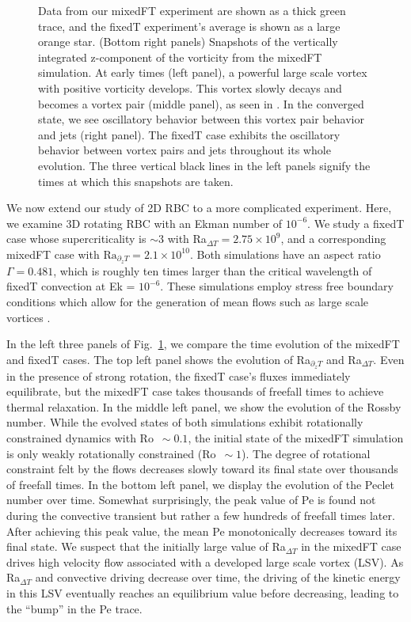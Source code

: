 \documentclass[aps, pre, onecolumn, nofootinbib, notitlepage, groupedaddress, amsfonts, amssymb, amsmath, longbibliography, superscriptaddress]{revtex4-1}
\begin{document}
\begin{figure}
{	Data from our mixedFT experiment are shown as a thick green trace, and the fixedT experiment's average is shown as a large orange star.
	(Bottom right panels) Snapshots of the vertically integrated z-component of the vorticity from the mixedFT simulation.
	At early times (left panel), a powerful large scale vortex with positive vorticity develops.
	This vortex slowly decays and becomes a vortex pair (middle panel), as seen in \cite{stellmach&all2014}.
	In the converged state, we see oscillatory behavior between this vortex pair behavior and jets (right panel).
	The fixedT case exhibits the oscillatory behavior between vortex pairs and jets throughout its whole evolution.
	The three vertical black lines in the left panels signify the times at which this snapshots are taken.
\label{fig:rotating_panels} }
\end{figure}



We now extend our study of 2D RBC to a more complicated experiment.
Here, we examine 3D rotating RBC with an Ekman number of $10^{-6}$.
We study a fixedT case whose supercriticality is $\sim 3$ with Ra$_{\Delta T} = 2.75\times 10^9$, and a corresponding mixedFT case with $\text{Ra}_{\partial_z T} = 2.1 \times 10^{10}$.
Both simulations have an aspect ratio $\Gamma = 0.481$, which is roughly ten times larger than the critical wavelength of fixedT convection at Ek = $10^{-6}$.
These simulations employ stress free boundary conditions which allow for the generation of mean flows such as large scale vortices \cite{couston&all2019}.

In the left three panels of Fig.~\ref{fig:rotating_panels}, we compare the time evolution of the mixedFT and fixedT cases.
The top left panel shows the evolution of Ra$_{\partial_z T}$ and Ra$_{\Delta T}$.
Even in the presence of strong rotation, the fixedT case's fluxes immediately equilibrate, but the mixedFT case takes thousands of freefall times to achieve thermal relaxation.
In the middle left panel, we show the evolution of the Rossby number.
While the evolved states of both simulations exhibit rotationally constrained dynamics with Ro $\,\sim 0.1$, the initial state of the mixedFT simulation is only weakly rotationally constrained (Ro $\,\sim 1$).
The degree of rotational constraint felt by the flows decreases slowly toward its final state over thousands of freefall times.
In the bottom left panel, we display the evolution of the Peclet number over time.
Somewhat surprisingly, the peak value of Pe is found not during the convective transient but rather a few hundreds of freefall times later.
After achieving this peak value, the mean Pe monotonically decreases toward its final state.
We suspect that the initially large value of Ra$_{\Delta T}$ in the mixedFT case drives high velocity flow associated with a developed large scale vortex (LSV).
As Ra$_{\Delta T}$ and convective driving decrease over time, the driving of the kinetic energy in this LSV eventually reaches an equilibrium value before decreasing, leading to the ``bump'' in the Pe trace.
\end{document}
